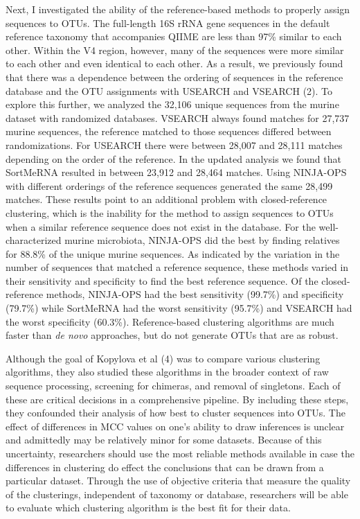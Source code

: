 \documentclass[11pt,]{article}
\begin{document}
Next, I investigated the ability of the reference-based methods to
properly assign sequences to OTUs. The full-length 16S rRNA gene
sequences in the default reference taxonomy that accompanies QIIME are
less than 97\% similar to each other. Within the V4 region, however,
many of the sequences were more similar to each other and even identical
to each other. As a result, we previously found that there was a
dependence between the ordering of sequences in the reference database
and the OTU assignments with USEARCH and VSEARCH (2). To explore this
further, we analyzed the 32,106 unique sequences from the murine dataset
with randomized databases. VSEARCH always found matches for 27,737
murine sequences, the reference matched to those sequences differed
between randomizations. For USEARCH there were between 28,007 and 28,111
matches depending on the order of the reference. In the updated analysis
we found that SortMeRNA resulted in between 23,912 and 28,464 matches.
Using NINJA-OPS with different orderings of the reference sequences
generated the same 28,499 matches. These results point to an additional
problem with closed-reference clustering, which is the inability for the
method to assign sequences to OTUs when a similar reference sequence
does not exist in the database. For the well-characterized murine
microbiota, NINJA-OPS did the best by finding relatives for 88.8\% of
the unique murine sequences. As indicated by the variation in the number
of sequences that matched a reference sequence, these methods varied in
their sensitivity and specificity to find the best reference sequence.
Of the closed-reference methods, NINJA-OPS had the best sensitivity
(99.7\%) and specificity (79.7\%) while SortMeRNA had the worst
sensitivity (95.7\%) and VSEARCH had the worst specificity (60.3\%).
Reference-based clustering algorithms are much faster than \emph{de
novo} approaches, but do not generate OTUs that are as robust.

Although the goal of Kopylova et al (4) was to compare various
clustering algorithms, they also studied these algorithms in the broader
context of raw sequence processing, screening for chimeras, and removal
of singletons. Each of these are critical decisions in a comprehensive
pipeline. By including these steps, they confounded their analysis of
how best to cluster sequences into OTUs. The effect of differences in
MCC values on one's ability to draw inferences is unclear and admittedly
may be relatively minor for some datasets. Because of this uncertainty,
researchers should use the most reliable methods available in case the
differences in clustering do effect the conclusions that can be drawn
from a particular dataset. Through the use of objective criteria that
measure the quality of the clusterings, independent of taxonomy or
database, researchers will be able to evaluate which clustering
algorithm is the best fit for their data.
\end{document}
